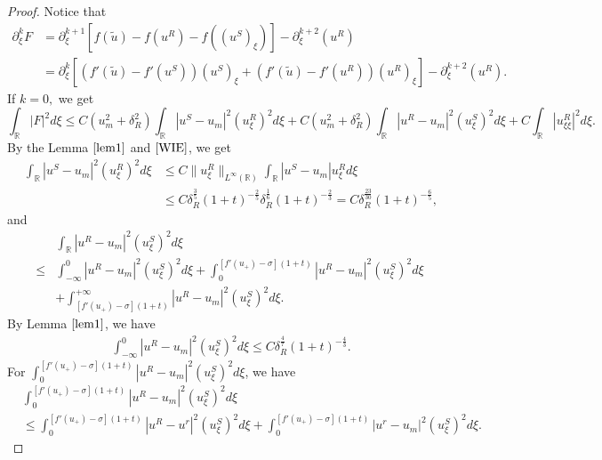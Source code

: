 \documentclass[10pt,reqno]{amsart}
\numberwithin{equation}{section}
\begin{document}
	\begin{proof}
		Notice that 
		\begin{align*}
			\partial_{\xi}^kF&= \partial_{\xi}^{k+1}\left[f(\tilde{u}) - f(u^R) - f((u^S)_{\xi})\right]- \partial_{\xi}^{k+2}(u^R)\\
			&= \partial_{\xi}^k\left[\left(f'(\tilde{u}) - f'(u^S)\right)(u^S)_{\xi}+ \left(f'(\tilde{u}) - f'(u^R)\right)(u^R)_{\xi}\right] -  \partial_{\xi}^{k+2}(u^R).
		\end{align*}
		If $k=0,$ we get
		\begin{equation*}
			\int_{\mathbb{R}} |F|^2 d\xi \leq C(u_m^2+\delta_{R}^2) \int_{\mathbb{R}} |u^S - u_m|^2 (u_\xi^R)^2 d\xi + C(u_m^2+\delta_{R}^2) \int_{\mathbb{R}} |u^R - u_m|^2 (u_\xi^S)^2 d\xi + C \int_{\mathbb{R}} |u_{\xi\xi}^R|^2 d\xi.
		\end{equation*}
		By the Lemma $\ref{lem1}$ and $\ref{WIE}$,  we get
		\begin{align*}
			\int_{\mathbb{R}} |u^S - u_m|^2 (u_{\xi}^R)^2 d\xi &\leq C \|u_{\xi}^R\|_{L^{\infty}(\mathbb{R})} \int_{\mathbb{R}} |u^S - u_m| u_{\xi}^R d\xi \\
			&\leq C \delta_R^{\frac{3}{5}}(1+t)^{-\frac{2}{5}} \delta_R^{\frac{1}{6}}(1+t)^{-\frac{2}{3}}= C\delta_R^{\frac{23}{30}} (1+t)^{-\frac{6}{5}},
		\end{align*}
		and
		\begin{align}\label{rms}
			&\int_{\mathbb{R}} |u^R - u_m|^2 (u_{\xi}^S)^2 d\xi \nonumber\\
			\leq& \int_{-\infty}^{0} |u^R - u_m|^2 (u_{\xi}^S)^2 d\xi + \int_{0}^{[f'(u_+)-\sigma](1+t)} |u^R - u_m|^2 (u_{\xi}^S)^2 d\xi \  \\
			&+ \int_{[f'(u_+)-\sigma](1+t)}^{+\infty} |u^R - u_m|^2 (u_{\xi}^S)^2 d\xi.\nonumber
		\end{align}
		By Lemma $\ref{lem1}$, we have
		\begin{align*}
			\int_{-\infty}^{0} |u^R - u_m|^2 (u_\xi^S)^2 d\xi \leq C \delta_R^{\frac{4}{7}} (1+t)^{-\frac{4}{3}}.
		\end{align*}
		For $\int_{0}^{[f'(u_{+})-\sigma](1+t)} |u^{R}-u_{m}|^{2}(u_{\xi}^{S})^{2}d\xi$, we have
		\begin{align*}
			&\int_{0}^{[f'(u_{+})-\sigma](1+t)} |u^{R}-u_{m}|^{2}(u_{\xi}^{S})^{2}d\xi\\
			&\leq \int_{0}^{[f'(u_{+})-\sigma](1+t)} |u^{R}-u^{r}|^{2}(u_{\xi}^{S})^{2}d\xi + \int_{0}^{[f'(u_{+})-\sigma](1+t)} |u^{r}-u_{m}|^{2}(u_{\xi}^{S})^{2}d\xi.
		\end{align*}

\end{proof}
\end{document}
